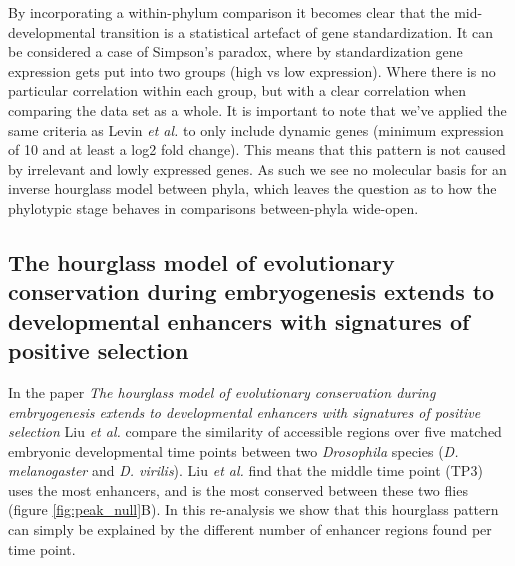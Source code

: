 By incorporating a within-phylum comparison it becomes clear that the mid-developmental transition is a statistical artefact of gene standardization. It can be considered a case of Simpson's paradox, where by standardization gene expression gets put into two groups (high vs low expression). Where there is no particular correlation within each group, but with a clear correlation when comparing the data set as a whole\cite{Saccenti2023}. It is important to note that we've applied the same criteria as Levin \textit{et al.} to only include dynamic genes (minimum expression of 10 and at least a log2 fold change). This means that this pattern is not caused by irrelevant and lowly expressed genes. As such we see no molecular basis for an inverse hourglass model between phyla, which leaves the question as to how the phylotypic stage behaves in comparisons between-phyla wide-open.

\subsection{The hourglass model of evolutionary conservation during embryogenesis extends to developmental enhancers with signatures of positive selection} \label{subsection:liu}

In the paper \textit{The hourglass model of evolutionary conservation during embryogenesis extends to developmental enhancers with signatures of positive selection} Liu \textit{et al.} compare the similarity of accessible regions over five matched embryonic developmental time points between two \textit{Drosophila} species (\textit{D. melanogaster} and \textit{D. virilis}). Liu \textit{et al.} find that the middle time point (TP3) uses the most enhancers, and is the most conserved between these two flies (figure \ref{fig:peak_null}B). In this re-analysis we show that this hourglass pattern can simply be explained by the different number of enhancer regions found per time point.

